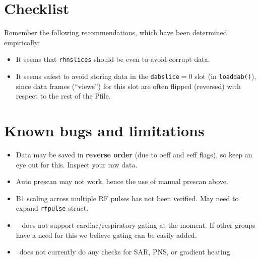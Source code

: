 \section{Checklist}

Remember the following recommendations, which have been determined empirically:
\begin{itemize}
	\item It seems that {\tt rhnslices} should be even to avoid corrupt data.
	\item It seems safest to avoid storing data in the {\tt dabslice}$=$0 slot (in \texttt{loaddab()}), since data frames (``views'') for this slot are often flipped (reversed) with respect to the rest of the Pfile.
\end{itemize}


\section{Known bugs and limitations}
\begin{itemize}
	\item Data may be saved in \textbf{reverse order} (due to oeff and eeff flags), so keep an eye out for this. Inspect your raw data. %
	\item Auto prescan may not work, hence the use of manual prescan above.
	\item B1 scaling across multiple RF pulses has not been verified. May need to expand \texttt{rfpulse} struct.
	\item \toppe~ does not support cardiac/respiratory gating at the moment. If other groups have a need for this we believe gating can be easily added.
	\item \toppe~does not currently do any checks for SAR, PNS, or gradient heating.
\end{itemize}


